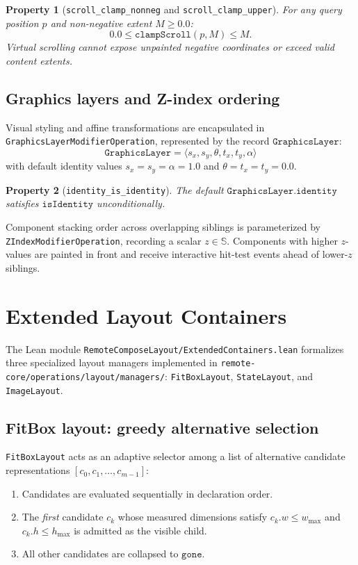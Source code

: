 \documentclass[11pt,a4paper]{article}
\newcommand{\Sc}{\mathbb{S}}
\newcommand{\lo}[1]{\texttt{#1}}       %
\newcommand{\jv}[1]{\texttt{#1}}       %
\newcommand{\file}[1]{\texttt{#1}}
\theoremstyle{definition}
\theoremstyle{plain}
\newtheorem{property}{Property}[section]
\theoremstyle{remark}
\begin{document}
\begin{property}[\lo{scroll\_clamp\_nonneg} and \lo{scroll\_clamp\_upper}]
For any query position $p$ and non-negative extent $M \ge 0.0$:
\[
  0.0 \le \lo{clampScroll}(p, M) \le M.
\]
Virtual scrolling cannot expose unpainted negative coordinates or exceed valid content extents.
\end{property}

\subsection{Graphics layers and Z-index ordering}
\label{sec:mod-graphics}

Visual styling and affine transformations are encapsulated in \jv{GraphicsLayerModifierOperation},
represented by the record $\lo{GraphicsLayer}$:
\[
  \lo{GraphicsLayer} = \langle s_x, s_y, \theta, t_x, t_y, \alpha \rangle
\]
with default identity values $s_x = s_y = \alpha = 1.0$ and $\theta = t_x = t_y = 0.0$.
\begin{property}[\lo{identity\_is\_identity}]
The default $\lo{GraphicsLayer.identity}$ satisfies $\lo{isIdentity}$ unconditionally.
\end{property}

Component stacking order across overlapping siblings is parameterized by \jv{ZIndexModifierOperation},
recording a scalar $z \in \Sc$. Components with higher $z$-values are painted in front and receive
interactive hit-test events ahead of lower-$z$ siblings.

\section{Extended Layout Containers}
\label{sec:extended-containers}

The Lean module \file{RemoteComposeLayout/ExtendedContainers.lean} formalizes
three specialized layout managers implemented in \file{remote-core/operations/layout/managers/}:
\jv{FitBoxLayout}, \jv{StateLayout}, and \jv{ImageLayout}.

\subsection{FitBox layout: greedy alternative selection}
\label{sec:fitbox}

\jv{FitBoxLayout} acts as an adaptive selector among a list of alternative candidate
representations $[c_0, c_1, \ldots, c_{m-1}]$:
\begin{enumerate}
  \item Candidates are evaluated sequentially in declaration order.
  \item The \emph{first} candidate $c_k$ whose measured dimensions satisfy
    $c_k.w \le w_{\max}$ and $c_k.h \le h_{\max}$ is admitted as the visible child.
  \item All other candidates are collapsed to $\lo{gone}$.
\end{enumerate}
\end{document}

